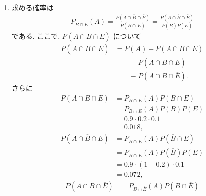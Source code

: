 \begin{qenumerate}
{\begin{enumerate}
{\begin{align}
				\end{align}
				$B$ と $E$ は独立だから
				\begin{align}
					P(A\cap B) &= P_{B\cap E}(A)P(B)P(E) \\
						&\quad\quad{} + P_{B\cap\overline{E}}(A)P(B)P\left(\overline{E}\right) \\
						&= 0.9\cdot 0.2\cdot 0.1 + 0.7\cdot 0.2\cdot (1 - 0.1) \\
						&= 0.144.
				\end{align}
				したがって
				\begin{align}
					P_{A}(B) = \frac{0.144}{0.36} = \red{0.4}.
				\end{align}
			}
			\item{
				求める確率は
				\begin{align}
					P_{\overline{B}\cap\overline{E}}(A) = \frac{P\left(A\cap \overline{B}\cap \overline{E}\right)}{P\left(\overline{B}\cap \overline{E}\right)} = \frac{P\left(A\cap \overline{B}\cap \overline{E}\right)}{P\left(\overline{B}\right)P\left(\overline{E}\right)}
				\end{align}
				である.
				ここで, $P\left(A\cap \overline{B}\cap \overline{E}\right)$ について
				\begin{align}
					P\left(A\cap \overline{B}\cap \overline{E}\right) &= P(A) - P(A\cap B\cap E) \\
						&\quad\quad{} - P\left(A\cap \overline{B}\cap E\right) \\
						&\quad\quad{} - P\left(A\cap B\cap \overline{E}\right).
				\end{align}
				さらに
				\begin{align}
						P(A\cap B\cap E) &= P_{B\cap E}(A)P(B\cap E) \\
							&= P_{B\cap E}(A)P(B)P(E) \\
							&= 0.9\cdot 0.2\cdot 0.1 \\
							&= 0.018, 
				\end{align}
				\begin{align}
						P\left(A\cap \overline{B}\cap E\right) &= P_{\overline{B}\cap E}(A)P\left(\overline{B}\cap E\right) \\
							&= P_{\overline{B}\cap E}(A)P\left(\overline{B}\right)P(E) \\
							&= 0.9\cdot (1 - 0.2)\cdot 0.1 \\
							&= 0.072, 
				\end{align}
				\begin{align}
						P\left(A\cap B\cap \overline{E}\right) &= P_{B\cap \overline{E}}(A)P\left(B\cap \overline{E}\right) \\

\end{align}}
\end{enumerate}}
\end{qenumerate}
